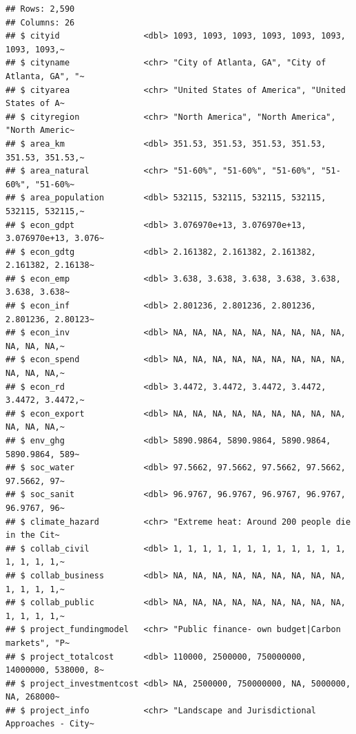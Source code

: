 \documentclass[
]{article}
\begin{document}
\begin{verbatim}
## Rows: 2,590
## Columns: 26
## $ cityid                 <dbl> 1093, 1093, 1093, 1093, 1093, 1093, 1093, 1093,~
## $ cityname               <chr> "City of Atlanta, GA", "City of Atlanta, GA", "~
## $ cityarea               <chr> "United States of America", "United States of A~
## $ cityregion             <chr> "North America", "North America", "North Americ~
## $ area_km                <dbl> 351.53, 351.53, 351.53, 351.53, 351.53, 351.53,~
## $ area_natural           <chr> "51-60%", "51-60%", "51-60%", "51-60%", "51-60%~
## $ area_population        <dbl> 532115, 532115, 532115, 532115, 532115, 532115,~
## $ econ_gdpt              <dbl> 3.076970e+13, 3.076970e+13, 3.076970e+13, 3.076~
## $ econ_gdtg              <dbl> 2.161382, 2.161382, 2.161382, 2.161382, 2.16138~
## $ econ_emp               <dbl> 3.638, 3.638, 3.638, 3.638, 3.638, 3.638, 3.638~
## $ econ_inf               <dbl> 2.801236, 2.801236, 2.801236, 2.801236, 2.80123~
## $ econ_inv               <dbl> NA, NA, NA, NA, NA, NA, NA, NA, NA, NA, NA, NA,~
## $ econ_spend             <dbl> NA, NA, NA, NA, NA, NA, NA, NA, NA, NA, NA, NA,~
## $ econ_rd                <dbl> 3.4472, 3.4472, 3.4472, 3.4472, 3.4472, 3.4472,~
## $ econ_export            <dbl> NA, NA, NA, NA, NA, NA, NA, NA, NA, NA, NA, NA,~
## $ env_ghg                <dbl> 5890.9864, 5890.9864, 5890.9864, 5890.9864, 589~
## $ soc_water              <dbl> 97.5662, 97.5662, 97.5662, 97.5662, 97.5662, 97~
## $ soc_sanit              <dbl> 96.9767, 96.9767, 96.9767, 96.9767, 96.9767, 96~
## $ climate_hazard         <chr> "Extreme heat: Around 200 people die in the Cit~
## $ collab_civil           <dbl> 1, 1, 1, 1, 1, 1, 1, 1, 1, 1, 1, 1, 1, 1, 1, 1,~
## $ collab_business        <dbl> NA, NA, NA, NA, NA, NA, NA, NA, NA, 1, 1, 1, 1,~
## $ collab_public          <dbl> NA, NA, NA, NA, NA, NA, NA, NA, NA, 1, 1, 1, 1,~
## $ project_fundingmodel   <chr> "Public finance- own budget|Carbon markets", "P~
## $ project_totalcost      <dbl> 110000, 2500000, 750000000, 14000000, 538000, 8~
## $ project_investmentcost <dbl> NA, 2500000, 750000000, NA, 5000000, NA, 268000~
## $ project_info           <chr> "Landscape and Jurisdictional Approaches - City~
\end{verbatim}
\end{document}
